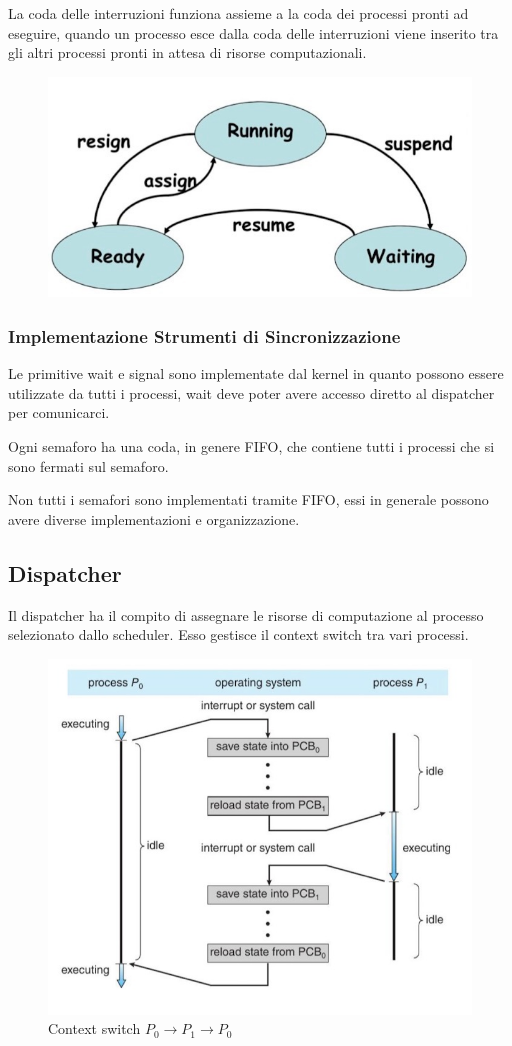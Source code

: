La coda delle interruzioni funziona assieme a la coda dei processi pronti ad eseguire, quando un processo esce dalla coda delle interruzioni viene inserito tra gli altri processi pronti in attesa di risorse computazionali.

\begin{figure}[H]
    \centering
    \includegraphics[width=0.45\linewidth]{assets/process-lifecycle.jpeg}
\end{figure}

\subsubsection{Implementazione Strumenti di Sincronizzazione}
Le primitive wait e signal sono implementate dal kernel in quanto possono essere utilizzate da tutti i processi, wait deve poter avere accesso diretto al dispatcher per comunicarci.

\spacer
Ogni semaforo ha una coda, in genere FIFO, che contiene tutti i processi che si sono fermati sul semaforo.

\begin{note}
    Non tutti i semafori sono implementati tramite FIFO, essi in generale possono avere diverse implementazioni e organizzazione.
\end{note}

\subsection{Dispatcher}
Il dispatcher ha il compito di assegnare le risorse di computazione al processo selezionato dallo scheduler. Esso gestisce il context switch tra vari processi.

\begin{figure}[H]
    \centering
    \includegraphics[width=0.5\linewidth]{assets/dispatcher.jpg}
    \caption{Context switch $P_0 \rightarrow P_1 \rightarrow P_0$ }
\end{figure}

